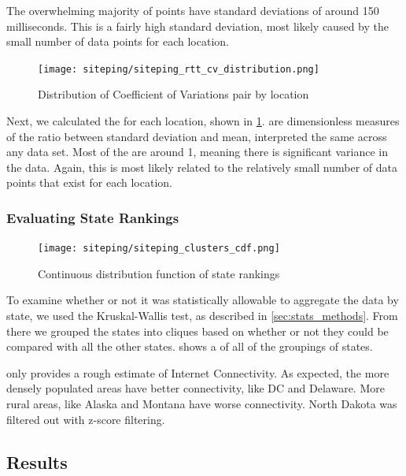 The overwhelming majority of points have standard deviations of around 150 milliseconds. This is a fairly high standard deviation, most likely caused by the small number of data points for each location.

\begin{figure}[h]
    \centering
    \texttt{[image: siteping/siteping\_rtt\_cv\_distribution.png]}
    \caption{Distribution of Coefficient of Variations pair by location}
    \label{fig:siteping_cv_dist}
\end{figure}

Next, we calculated the \cv for each location, shown in \cref{fig:siteping_cv_dist}. \CVs are dimensionless measures of the ratio between standard deviation and mean, interpreted the same across any data set. Most of the \cvs are around 1, meaning there is significant variance in the data. Again, this is most likely related to the relatively small number of data points that exist for each location.

\subsubsection{Evaluating State Rankings}

\begin{figure}[h]
    \centering
    \texttt{[image: siteping/siteping\_clusters\_cdf.png]}
    \caption{Continuous distribution function of state rankings}
    \label{fig:siteping_cdf}
\end{figure}
To examine whether or not it was statistically allowable to aggregate the data by state, we used the Kruskal-Wallis test, as described in \cref{sec:stats_methods}. From there we grouped the states into cliques based on whether or not they could be compared with all the other states.  shows a \cdf of all of the groupings of states.

 

 only provides a rough estimate of Internet Connectivity. As expected, the more densely populated areas have better connectivity, like DC and Delaware. More rural areas, like Alaska and Montana have worse connectivity. North Dakota was filtered out with z-score filtering.
\subsection{Results}

